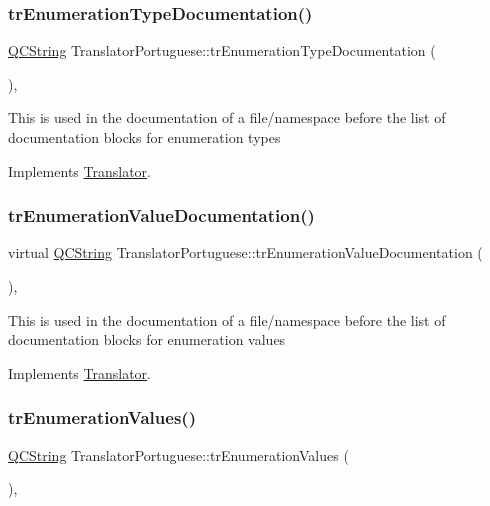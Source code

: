 \subsubsection{\texorpdfstring{trEnumerationTypeDocumentation()}{trEnumerationTypeDocumentation()}}
{\footnotesize\ttfamily \mbox{\hyperlink{class_q_c_string}{Q\+C\+String}} Translator\+Portuguese\+::tr\+Enumeration\+Type\+Documentation (\begin{DoxyParamCaption}{ }\end{DoxyParamCaption})\hspace{0.3cm}{\ttfamily [inline]}, {\ttfamily [virtual]}}

This is used in the documentation of a file/namespace before the list of documentation blocks for enumeration types 

Implements \mbox{\hyperlink{class_translator}{Translator}}.

\mbox{\label{class_translator_portuguese_abc195d606fac92023893842cc4eb04d8}} 
\subsubsection{\texorpdfstring{trEnumerationValueDocumentation()}{trEnumerationValueDocumentation()}}
{\footnotesize\ttfamily virtual \mbox{\hyperlink{class_q_c_string}{Q\+C\+String}} Translator\+Portuguese\+::tr\+Enumeration\+Value\+Documentation (\begin{DoxyParamCaption}{ }\end{DoxyParamCaption})\hspace{0.3cm}{\ttfamily [inline]}, {\ttfamily [virtual]}}

This is used in the documentation of a file/namespace before the list of documentation blocks for enumeration values 

Implements \mbox{\hyperlink{class_translator}{Translator}}.

\mbox{\label{class_translator_portuguese_a1b3e078635dcf50123d39ca272fda3b9}} 
\subsubsection{\texorpdfstring{trEnumerationValues()}{trEnumerationValues()}}
{\footnotesize\ttfamily \mbox{\hyperlink{class_q_c_string}{Q\+C\+String}} Translator\+Portuguese\+::tr\+Enumeration\+Values (\begin{DoxyParamCaption}{ }\end{DoxyParamCaption})\hspace{0.3cm}{\ttfamily [inline]}, {\ttfamily [virtual]}}

